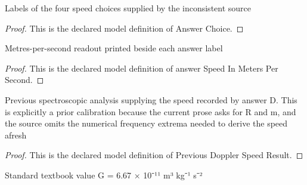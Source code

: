 \begin{definition}
  \label{def:physics:phyx-mini-0514:phyxminiproblems-problemphyxmini0514-answerchoice}
  Labels of the four speed choices supplied by the inconsistent source
\end{definition}
\begin{proof}
  This is the declared model definition of Answer Choice.
\end{proof}
\begin{definition}
  \label{def:physics:phyx-mini-0514:phyxminiproblems-problemphyxmini0514-answerspeedinmeterspersecond}
  Metres-per-second readout printed beside each answer label
\end{definition}
\begin{proof}
  This is the declared model definition of answer Speed In Meters Per Second.
\end{proof}
\begin{definition}
  \label{def:physics:phyx-mini-0514:phyxminiproblems-problemphyxmini0514-previousdopplerspeedresult}
  Previous spectroscopic analysis supplying the speed recorded by answer D. This is explicitly a prior calibration because the current prose asks for R and m, and the source omits the numerical frequency extrema needed to derive the speed afresh
\end{definition}
\begin{proof}
  This is the declared model definition of Previous Doppler Speed Result.
\end{proof}
\begin{definition}
  \label{def:physics:phyx-mini-0514:phyxminiproblems-problemphyxmini0514-usestextbookgravitationalconstant}
  Standard textbook value G = 6.67 × 10⁻¹¹ m³ kg⁻¹ s⁻²
\end{definition}
